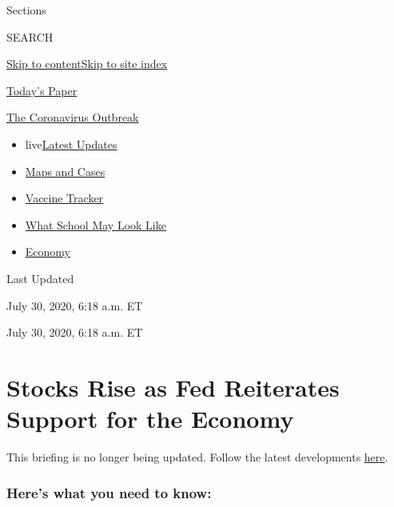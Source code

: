 Sections

SEARCH

\protect\hyperlink{site-content}{Skip to
content}\protect\hyperlink{site-index}{Skip to site index}

\href{https://myaccount.nytimes.com/auth/login?response_type=cookie\&client_id=vi}{}

\href{https://www.nytimes.com/section/todayspaper}{Today's Paper}

\href{https://www.nytimes.com/news-event/coronavirus}{The Coronavirus
Outbreak}

\begin{itemize}
\tightlist
\item
  live\href{https://www.nytimes.com/2020/08/01/world/coronavirus-covid-19.html}{Latest
  Updates}
\item
  \href{https://www.nytimes.com/interactive/2020/us/coronavirus-us-cases.html}{Maps
  and Cases}
\item
  \href{https://www.nytimes.com/interactive/2020/science/coronavirus-vaccine-tracker.html}{Vaccine
  Tracker}
\item
  \href{https://www.nytimes.com/interactive/2020/07/29/us/schools-reopening-coronavirus.html}{What
  School May Look Like}
\item
  \href{https://www.nytimes.com/live/2020/07/31/business/stock-market-today-coronavirus}{Economy}
\end{itemize}

Last Updated

July 30, 2020, 6:18 a.m. ET

July 30, 2020, 6:18 a.m. ET

\hypertarget{stocks-rise-as-fed-reiterates-support-for-the-economy}{%
\section{Stocks Rise as Fed Reiterates Support for the
Economy}\label{stocks-rise-as-fed-reiterates-support-for-the-economy}}

This briefing is no longer being updated. Follow the latest developments
\href{https://www.nytimes.com/live/2020/07/30/business/stock-market-today-coronavirus}{here}.

\hypertarget{heres-what-you-need-to-know}{%
\subsubsection{Here's what you need to
know:}\label{heres-what-you-need-to-know}}

